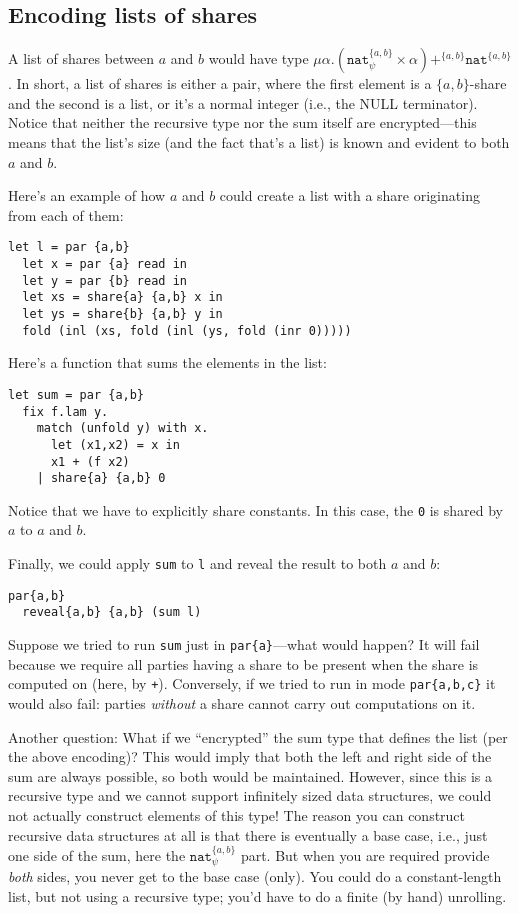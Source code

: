 \documentclass[10pt]{article}
\newcommand{\tnat}{\ensuremath{\mathtt{nat}}}
\newcommand{\tpair}[2]{\ensuremath{{#1} \times {#2}}}
\newcommand{\tsum}[3]{\ensuremath{{#1} +^{#3} {#2}}}
\newcommand{\trec}[2]{\ensuremath{\mu {#1}.{#2}}}
\begin{document}
\subsection{Encoding lists of shares}

\newcommand{\twoprins}{\ensuremath{\{a,b\}}}

A list of shares between $a$ and $b$ would have type
$\trec{\alpha}{\tsum{(\tpair{\tnat^{\twoprins}_\psi}{\alpha})}{\tnat^{\twoprins}}{\twoprins}}$. In
short, a list of shares is either a pair, where the first element is a
\twoprins-share and the second is a list, or it's a normal integer
(i.e., the NULL terminator). Notice that neither the recursive type
nor the sum itself are encrypted---this means that the list's size
(and the fact that's a list) is known and evident to both $a$ and $b$.

Here's an example of how $a$ and $b$ could create a list with a share
originating from each of them:
\begin{verbatim}
let l = par {a,b}
  let x = par {a} read in
  let y = par {b} read in
  let xs = share{a} {a,b} x in
  let ys = share{b} {a,b} y in
  fold (inl (xs, fold (inl (ys, fold (inr 0)))))
\end{verbatim}
Here's a function that sums the elements in the list:
\begin{verbatim}
let sum = par {a,b}
  fix f.lam y.
    match (unfold y) with x.
      let (x1,x2) = x in
      x1 + (f x2)
    | share{a} {a,b} 0
\end{verbatim}
Notice that we have to explicitly share constants. In this case, the
\verb+0+ is shared by $a$ to $a$ and $b$.

Finally, we could apply \verb+sum+ to \verb+l+ and reveal the result
to both $a$ and $b$:
\begin{verbatim}
par{a,b}
  reveal{a,b} {a,b} (sum l)
\end{verbatim}

Suppose we tried to run \verb+sum+ just in \verb+par{a}+---what would
happen? It will fail because we require all parties having a share to
be present when the share is computed on (here, by
\verb!+!). Conversely, if we tried to run in mode \verb+par{a,b,c}+ it
would also fail: parties \emph{without} a share cannot carry out
computations on it.

Another question: What if we ``encrypted'' the sum type that defines
the list (per the above encoding)? This would imply that both the left
and right side of the sum are always possible, so both would be
maintained. However, since this is a recursive type and we cannot
support infinitely sized data structures, we could not actually
construct elements of this type! The reason you can construct
recursive data structures at all is that there is eventually a base
case, i.e., just one side of the sum, here the $\tnat^{\{a,b\}}_\psi$
part. But when you are required provide \emph{both} sides, you never
get to the base case (only). You could do a constant-length list, but
not using a recursive type; you'd have to do a finite (by hand)
unrolling.
\end{document}
